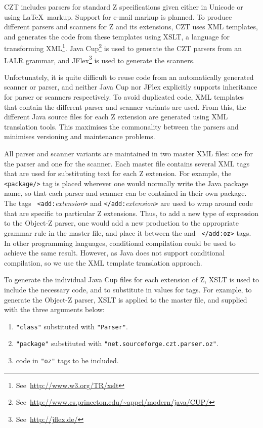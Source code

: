 \documentclass{llncs}
\begin{document}
  CZT includes parsers for standard Z specifications given either in
  Unicode or using \LaTeX\ markup.  Support for e-mail markup is
  planned. To produce different parsers and scanners for Z and its
  extensions, CZT uses XML templates, and generates the code from these
  templates using XSLT, a language for transforming XML\footnote{See~\url{http://www.w3.org/TR/xslt}}. Java
  Cup\footnote{See~\url{http://www.cs.princeton.edu/~appel/modern/java/CUP/}} is
  used to generate the CZT parsers from an LALR grammar, and
  JFlex\footnote{See~\url{http://jflex.de/}} is used to generate the
  scanners.

  Unfortunately, it is quite difficult to reuse code from an
  automatically generated scanner or parser, and neither Java Cup nor
  JFlex explicitly supports inheritance for parser or scanners
  respectively.  To avoid duplicated code, XML templates that contain
  the different parser and scanner variants are used. From this, the
  different Java source files for each Z extension are generated using
  XML translation tools.  This maximises the commonality between the
  parsers and minimises versioning and maintenance problems.

All parser and scanner variants are maintained in two master XML
files: one for the parser and one for the scanner. Each master file
contains several XML tags that are used for substituting text for each
Z extension. For example, the {\tt <package/>} tag is placed wherever
one would normally write the Java package name, so that each parser
and scanner can be contained in their own package. The tags {\tt
<add:}{\em extension}{\tt >} and {\tt </add:}{\em extension}{\tt >}
are used to wrap around code that are specific to particular Z
extensions. Thus, to add a new type of expression to the Object-Z parser,
one would add a new production to the appropriate grammar rule in the
master file, and place it between the {\tt <add:oz>} and {\tt
</add:oz>} tags. In other programming languages, conditional compilation
could be used to achieve the same result. However, as Java does not
support conditional compilation, so we use the XML template translation
approach.

To generate the individual Java Cup files for each extension of Z,
XSLT is used to include the necessary code, and to substitute in
values for tags. For example, to generate the Object-Z parser, XSLT is
applied to the master file, and supplied with the three arguments
below:
\begin{enumerate}
  \item {\tt "class"} substituted with {\tt "Parser"}.
  \item {\tt "package"} substituted with {\tt "net.sourceforge.czt.parser.oz"}.
  \item code in {\tt "oz"} tags to be included.
\end{enumerate}
\end{document}
